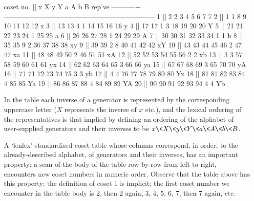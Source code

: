 \begintt
 coset no. ||      x      X      y      Y      a      A      b      B   rep've
-----------+------------------------------------------------------------------
         1 ||      2      2      3      4      5      6      7      7
         2 ||      1      1      8      9     10     11     12     12    x
         3 ||     13     13      4      1     14     15     16     16    y
         4 ||     17     17      1      3     18     19     20     20    Y
         5 ||     21     21     22     23     24      1     25     25    a
         6 ||     26     26     27     28      1     24     29     29    A
         7 ||     30     30     31     32     33     34      1      1    b
         8 ||     35     35      9      2     36     37     38     38    xy
         9 ||     39     39      2      8     40     41     42     42    xY
        10 ||     43     43     44     45     46      2     47     47    xa
        11 ||     48     48     49     50      2     46     51     51    xA
        12 ||     52     52     53     54     55     56      2      2    xb
        13 ||      3      3     57     58     59     60     61     61    yx
        14 ||     62     62     63     64     65      3     66     66    ya
        15 ||     67     67     68     69      3     65     70     70    yA
        16 ||     71     71     72     73     74     75      3      3    yb
        17 ||      4      4     76     77     78     79     80     80    Yx
        18 ||     81     81     82     83     84      4     85     85    Ya
        19 ||     86     86     87     88      4     84     89     89    YA
        20 ||     90     90     91     92     93     94      4      4    Yb
\endtt

In the table each  inverse  of  a  generator  is  represented  by  the
corresponding uppercase letter ($X$  represents  the  inverse  of  $x$
etc.), and the lexical ordering of the representatives is that implied
by defining an ordering of the alphabet  of  user-supplied  generators
and  their  inverses  to  be  $x\<X\<y\<Y\<a\<A\<b\<B$.  

A `lenlex'-standardised  coset  table  whose  columns  correspond,  in
order, to the already-described  alphabet,  of  generators  and  their
inverses, has an important property: a scan of the body of  the  table
row by row from left to right, encounters new coset numbers in numeric
order. Observe that the table above has this property: the  definition
of coset 1 is implicit; the first coset number  we  encounter  in  the
table body is 2, then 2 again, 3, 4, 5, 6, 7, then 7 again, etc.

